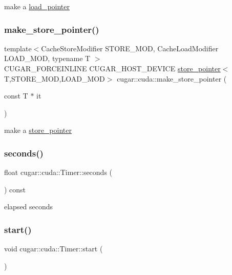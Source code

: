make a \hyperlink{structcugar_1_1cuda_1_1load__pointer}{load\+\_\+pointer} \mbox{\label{group___c_u_d_a_module_gac33a192d849e90b34a7011346c76e3f6}} 
\subsubsection{\texorpdfstring{make\+\_\+store\+\_\+pointer()}{make\_store\_pointer()}}
{\footnotesize\ttfamily template$<$Cache\+Store\+Modifier S\+T\+O\+R\+E\+\_\+\+M\+OD, Cache\+Load\+Modifier L\+O\+A\+D\+\_\+\+M\+OD, typename T $>$ \\
C\+U\+G\+A\+R\+\_\+\+F\+O\+R\+C\+E\+I\+N\+L\+I\+NE C\+U\+G\+A\+R\+\_\+\+H\+O\+S\+T\+\_\+\+D\+E\+V\+I\+CE \hyperlink{structcugar_1_1cuda_1_1store__pointer}{store\+\_\+pointer}$<$T,S\+T\+O\+R\+E\+\_\+\+M\+OD,L\+O\+A\+D\+\_\+\+M\+OD$>$ cugar\+::cuda\+::make\+\_\+store\+\_\+pointer (\begin{DoxyParamCaption}\item[{const T $\ast$}]{it }\end{DoxyParamCaption})}

make a \hyperlink{structcugar_1_1cuda_1_1store__pointer}{store\+\_\+pointer} \mbox{\label{group___c_u_d_a_module_ga86d41374527206653bad805dd13adfbc}} 
\subsubsection{\texorpdfstring{seconds()}{seconds()}}
{\footnotesize\ttfamily float cugar\+::cuda\+::\+Timer\+::seconds (\begin{DoxyParamCaption}{ }\end{DoxyParamCaption}) const\hspace{0.3cm}{\ttfamily [inline]}}

elapsed seconds \mbox{\label{group___c_u_d_a_module_ga01d05872296e3fde547ec5f57b092038}} 
\subsubsection{\texorpdfstring{start()}{start()}}
{\footnotesize\ttfamily void cugar\+::cuda\+::\+Timer\+::start (\begin{DoxyParamCaption}{ }\end{DoxyParamCaption})\hspace{0.3cm}{\ttfamily [inline]}}

